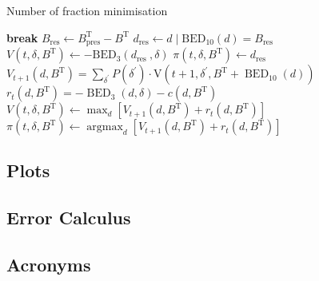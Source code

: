 \documentclass[\relativeRoot/ada.tex]{subfiles}
\begin{document}
\begin{algorithm}[!htb]
    \caption{Number of fraction minimisation}
    \begin{algorithmic}
         
         
            \State \textbf{break}
            \State $B_{\text{res}} \gets B_{\text{pres}}^\text{T} - B^\text{T}$ 
            \State $d_{\text{res}} \gets d \mid \mathrm{BED}_{10}(d)=B_{\text{res}}$ 
            \State $V\left(t, \delta, B^{\text{T}}\right) \leftarrow-\mathrm{BED}_{3}\left(d_{\text {res }}, \delta\right)$ 
            \State $\pi\left(t, \delta, B^{\text{T}}\right) \leftarrow d_{\text {res }}$ 
        \Else
            \State $V_{t+1}\left(d, B^{\text{T}}\right) = \sum_{\delta^{\prime}} P(\delta^{\prime}) \cdot \mathrm{V}\left(t+1, \delta^{\prime}, B^{\text{T}}+\operatorname{BED}_{10}(d)\right)$ 
            \State $r_{t}\left(d, B^{\text{T}}\right) = -\operatorname{BED}_{3}(d, \delta) - c(d, B^{\text{T}})$ 
            \State $V\left(t, \delta, B^{\text{T}}\right) \gets \max _{d}\left[ V_{t+1}(d, B^{\text{T}}) + r_t(d, B^{\text{T}}) \right]$ 
            \State $\pi\left(t, \delta, B^{\text{T}}\right) \gets \operatorname{argmax}_{d}\left[V_{t+1}(d, B^{\text{T}}) + r_t(d, B^{\text{T}}) \right]$
        \EndIf
        \EndFor
    \end{algorithmic}
\end{algorithm}








\subsection{Plots}



\subsection{Error Calculus}



\subsection{Acronyms}
    
\end{document}
